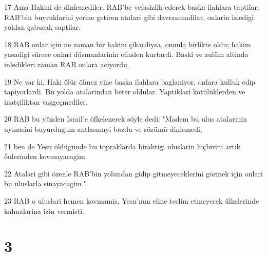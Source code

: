 \par 17 Ama Hakini de dinlemediler. RAB'be vefasizlik ederek baska ilahlara taptilar. RAB'bin buyruklarini yerine getiren atalari gibi davranmadilar, onlarin izledigi yoldan çabucak saptilar.
\par 18 RAB onlar için ne zaman bir hakim çikardiysa, onunla birlikte oldu; hakim yasadigi sürece onlari düsmanlarinin elinden kurtardi. Baski ve zulüm altinda inledikleri zaman RAB onlara aciyordu.
\par 19 Ne var ki, Haki ölür ölmez yine baska ilahlara baglaniyor, onlara kulluk edip tapiyorlardi. Bu yolda atalarindan beter oldular. Yaptiklari kötülüklerden ve inatçiliktan vazgeçmediler.
\par 20 RAB bu yüzden Israil'e öfkelenerek söyle dedi: "Madem bu ulus atalarinin uymasini buyurdugum antlasmayi bozdu ve sözümü dinlemedi,
\par 21 ben de Yesu öldügünde bu topraklarda biraktigi uluslarin hiçbirini artik önlerinden kovmayacagim.
\par 22 Atalari gibi özenle RAB'bin yolundan gidip gitmeyeceklerini görmek için onlari bu uluslarla sinayacagim."
\par 23 RAB o uluslari hemen kovmamis, Yesu'nun eline teslim etmeyerek ülkelerinde kalmalarina izin vermisti.

\chapter{3}

